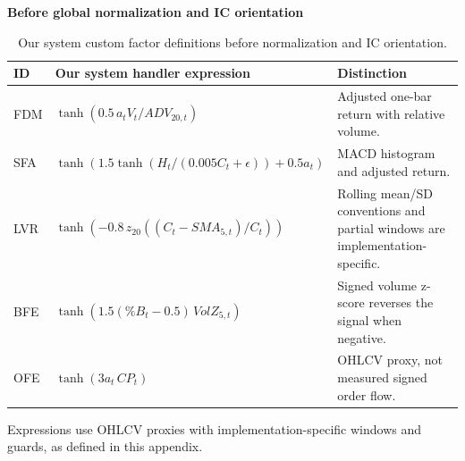 \begin{table}[!htb]
\centering\small
\setlength{\tabcolsep}{3pt}
\renewcommand{\arraystretch}{1.15}
\caption{Our system custom factor definitions before normalization and IC orientation.}
\label{tab:custom_definitions}
\textbf{Before global normalization and IC orientation}\par\smallskip
\begin{tabular}{lp{8.0cm}p{5.0cm}}
\hline
ID & Our system handler expression & Distinction \\
\hline
FDM & $\tanh(0.5\,a_t V_t/ADV_{20,t})$ & Adjusted one-bar return with relative volume. \\
SFA & $\tanh(1.5\tanh(H_t/(0.005C_t+\epsilon))+0.5a_t)$ & MACD histogram and adjusted return. \\
LVR & $\tanh(-0.8\,z_{20}((C_t-SMA_{5,t})/C_t))$ & Rolling mean/SD conventions and partial windows are implementation-specific. \\
BFE & $\tanh(1.5(\%B_t-0.5)\,VolZ_{5,t})$ & Signed volume z-score reverses the signal when negative. \\
OFE & $\tanh(3a_t\,CP_t)$ & OHLCV proxy, not measured signed order flow. \\
\hline
\end{tabular}\par\medskip
\begin{minipage}{\textwidth}\footnotesize Expressions use OHLCV proxies with implementation-specific windows and guards, as defined in this appendix.\end{minipage}
\end{table}
